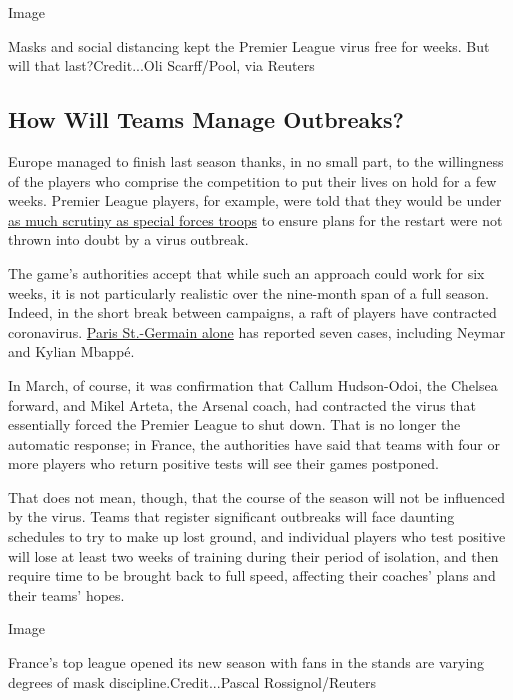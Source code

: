 Image

Masks and social distancing kept the Premier League virus free for
weeks. But will that last?Credit...Oli Scarff/Pool, via Reuters

\hypertarget{how-will-teams-manage-outbreaks}{%
\subsection{How Will Teams Manage
Outbreaks?}\label{how-will-teams-manage-outbreaks}}

Europe managed to finish last season thanks, in no small part, to the
willingness of the players who comprise the competition to put their
lives on hold for a few weeks. Premier League players, for example, were
told that they would be under
\href{https://www.nytimes3xbfgragh.onion/2020/08/24/sports/soccer/champions-league-premier-league-virus.html}{as
much scrutiny as special forces troops} to ensure plans for the restart
were not thrown into doubt by a virus outbreak.

The game's authorities accept that while such an approach could work for
six weeks, it is not particularly realistic over the nine-month span of
a full season. Indeed, in the short break between campaigns, a raft of
players have contracted coronavirus.
\href{https://www.nytimes3xbfgragh.onion/2020/09/02/sports/soccer/neymar-PSG-coronavirus.html}{Paris
St.-Germain alone} has reported seven cases, including Neymar and Kylian
Mbappé.

In March, of course, it was confirmation that Callum Hudson-Odoi, the
Chelsea forward, and Mikel Arteta, the Arsenal coach, had contracted the
virus that essentially forced the Premier League to shut down. That is
no longer the automatic response; in France, the authorities have said
that teams with four or more players who return positive tests will see
their games postponed.

That does not mean, though, that the course of the season will not be
influenced by the virus. Teams that register significant outbreaks will
face daunting schedules to try to make up lost ground, and individual
players who test positive will lose at least two weeks of training
during their period of isolation, and then require time to be brought
back to full speed, affecting their coaches' plans and their teams'
hopes.

Image

France's top league opened its new season with fans in the stands are
varying degrees of mask discipline.Credit...Pascal Rossignol/Reuters

